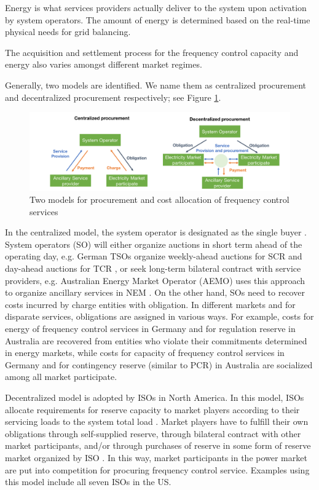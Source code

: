 Energy is what services providers actually deliver to the system upon activation by system operators. The amount of energy is determined based on the real-time physical needs for grid balancing.

The acquisition and settlement process for the frequency control capacity and energy also varies amongst different market regimes.

Generally, two models are identified. We name them as centralized procurement and decentralized procurement respectively; see Figure \ref{fig:FCR_market-model}.

\begin{figure}[h!]
	\centering
	\includegraphics[width=0.95\linewidth]{Figures/FCR_market_model}
	\caption{Two models for procurement and cost allocation of frequency control services}
	\label{fig:FCR_market-model}
\end{figure}

In the centralized model, the system operator is designated as the single buyer \cite{Rebours2009}. System operators (SO) will either organize auctions in short term ahead of the operating day, e.g. German TSOs organize weekly-ahead auctions for SCR and day-ahead auctions for TCR \cite{ConsentecGmbH2014}, or seek long-term bilateral contract with service providers, e.g. Australian Energy Market Operator (AEMO) uses this approach to organize ancillary services in NEM \cite{AEMO2015}. On the other hand, SOs need to recover costs incurred by charge entities with obligation. In different markets and for disparate services, obligations are assigned in various ways. For example, costs for energy of frequency control services in Germany and for regulation reserve in Australia are recovered from entities who violate their commitments determined in energy markets, while costs for capacity of frequency control services in Germany and for contingency reserve (similar to PCR) in Australia are socialized among all market participate. 

Decentralized model is adopted by ISOs in North America. In this model, ISOs allocate requirements for reserve capacity to market players according to their servicing loads to the system total load \cite{Rebours2009,EllisonJ.F.TesfatsionL.S.LooseV.W.Byrne2012,PJM2017b}. Market players have to fulfill their own obligations through self-supplied reserve, through bilateral contract with other market participants, and/or through purchases of reserve in some form of reserve market organized by ISO \cite{EllisonJ.F.TesfatsionL.S.LooseV.W.Byrne2012}. In this way, market participants in the power market are put into competition for procuring frequency control service. Examples using this model include all seven ISOs in the US.

